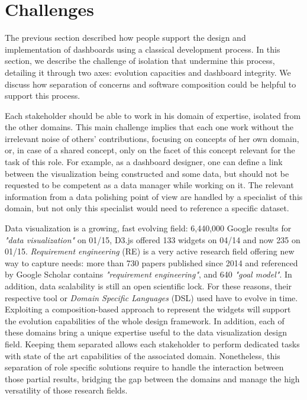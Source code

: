 \documentclass{sigplanconf}
\begin{document}
\section{Challenges}

The previous section described how people support the design and
implementation of dashboards using a classical development process. In
this section, we describe the challenge of isolation that undermine
this process, detailing it through two axes: evolution capacities and
dashboard integrity. We discuss how separation of concerns and
software composition could be helpful to support this process.


  Each stakeholder should be able to work
in his domain of expertise, isolated from the other domains. This main
challenge implies that each one work without the irrelevant noise of
others' contributions, focusing on concepts of her own domain, or, in
case of a shared concept, only on the facet of this concept relevant
for the task of this role.  For example, as a dashboard designer, one
can define a link between the visualization being constructed and some
data, but should not be requested to be competent as a data manager
while working on it.  The relevant information from a data polishing
point of view are handled by a specialist of this domain, but not only
this specialist would need to reference a specific dataset.

  Data visualization is a growing,
fast evolving field: 6,440,000 Google results for \emph{"data
  visualization"} on 01/15, D3.js offered 133 widgets on 04/14 and now
235 on 01/15. \emph{Requirement engineering} (RE) is a very active
research field offering new way to capture needs: more than 730 papers
published since 2014 and referenced by Google Scholar contains
\emph{"requirement engineering"}, and 640 \emph{"goal model"}. In
addition, data scalability is still an open scientific lock. For these
reasons, their respective tool or \emph{Domain Specific Languages}
(DSL) used have to evolve in time.  Exploiting a composition-based
approach to represent the widgets will support the evolution
capabilities of the whole design framework. In addition, each of these
domains bring a unique expertise useful to the data visualization
design field. Keeping them separated allows each stakeholder to
perform dedicated tasks with state of the art capabilities of the
associated domain.  Nonetheless, this separation of role specific
solutions require to handle the interaction between those partial
results, bridging the gap between the domains and manage the high
versatility of those research fields.
\end{document}
